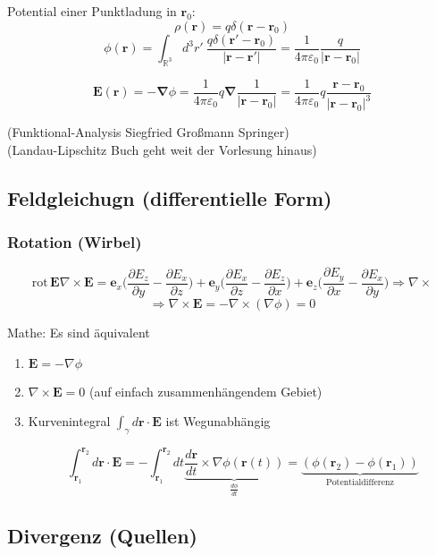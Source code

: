 \documentclass[titlepage,11pt,a4paper,ngerman]{report}
\newcommand{\prt}[2]{\frac{\partial #1}{\partial #2}}
\newcommand{\eofr}{\vec{E}(\vec{r})}
\newcommand{\kq}{\frac{1}{4\pi\epsilon_0}}
\newcommand{\intt}[2]{\int_{#1}^{#2}}
\renewcommand{\vec}[1]{\boldsymbol{#1}}
\newcommand{\lcom}[1]{\color{MidnightBlue}#1\color{black}}
\renewcommand{\epsilon}{\varepsilon}
\newcommand{\vabla}{\boldsymbol{\nabla}}
\renewcommand{\paragraph}[1]{\subsubsection{#1}}
\begin{document}
Potential einer Punktladung in $\vec{r}_0$:
$$\rho(\vec{r}) = q \delta(\vec{r}-\vec{r}_0)$$
$$\phi(\vec{r}) = \int_{\mathbb R^3} d^3 r'\ \frac{q\delta(\vec{r}' - \vec{r}_0)}{|\vec{r}-\vec{r}'|} = \kq \frac{q}{|\vec{r} - \vec{r}_0|}$$

$$\eofr = - \vabla \phi = \kq q \vabla \frac{1}{|\vec{r} - \vec{r}_0|} = \kq q \frac{\vec{r} - \vec{r}_0}{|\vec{r} - \vec{r}_0|^3}$$


\lcom{(Funktional-Analysis Siegfried Großmann Springer)\\
	(Landau-Lipschitz Buch geht weit der Vorlesung hinaus)}

\subsection{Feldgleichugn (differentielle Form)}

\paragraph{Rotation (Wirbel)}
$$\textrm{rot}\, \vec{E} \nabla \times \vec{E} = \vec{e}_x \bigg(\prt{E_z}{y} - \prt{E_x}{z}\bigg) + \vec{e}_y \bigg(\prt{E_x}{z} - \prt{E_z}{x}\bigg) + \vec{e}_z \bigg(\prt{E_y}{x} - \prt{E_x}{y}\bigg) \Rightarrow \nabla \times$$
$$\Rightarrow \nabla \times \vec{E} = - \nabla \times (\nabla\phi) = 0$$

Mathe: Es sind äquivalent 
\begin{enumerate}[i]
	\item $\vec{E} = - \nabla\phi$
	\item $\nabla \times \vec{E} = 0$ (auf einfach zusammenhängendem Gebiet)
	\item Kurvenintegral $\int_\gamma d\vec{r} \cdot \vec{E}$ ist Wegunabhängig 
	
	
	
	
	
	
	
	$$\intt{\vec{r}_1}{\vec{r}_2} d\vec{r} \cdot \vec{E} = - \intt{\vec{r}_1}{\vec{r}_2} dt \underbrace{\frac{d\vec{r}}{dt}\times \nabla\phi(\vec{r}(t))}_{\frac{d\phi}{dt}} = \underbrace{(\phi(\vec{r}_2) - \phi(\vec{r}_1))}_{\textrm{Potentialdifferenz}} $$
\end{enumerate}

\subsection{Divergenz (Quellen)}
\end{document}
